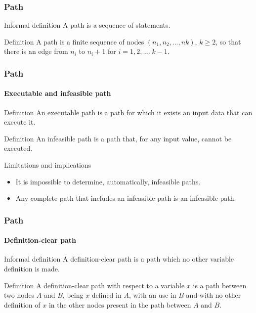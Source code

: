 \begin{frame}[parent={cmap:structural-software-testing},hasnext=true,hasprev=true]
\frametitle{Path}
\label{concept:path}

\begin{block:concept}{Informal definition}
A path is a sequence of statements.
\end{block:concept}

\begin{block:concept}{Definition}
A path is a finite sequence of nodes $(n_1, n_2, . . . , nk)$,
$k \geqslant 2$, so that there is an edge from $n_i$ to $n_i + 1$ for
$i = 1, 2, ... , k - 1$.
\end{block:concept}
\end{frame}


\begin{frame}
\frametitle{Path}
\framesubtitle{Executable and infeasible path}
\label{concept:infeasible-path}
\label{concept:missing-path}

\begin{block:concept}{Definition}
An executable path is a path for which it exists an input data that can
execute it.
\end{block:concept}

\begin{block:concept}{Definition}
An infeasible path is a path that, for any input value, cannot be executed.
\end{block:concept}

\begin{block:fact}{Limitations and implications}
\begin{itemize}
	\item It is impossible to determine, automatically, infeasible paths.

	\item Any complete path that includes an infeasible path is an
	infeasible path.
\end{itemize}
\end{block:fact}

\hfill
{}
\end{frame}



\begin{frame}
\frametitle{Path}
\framesubtitle{Definition-clear path}
\label{concept:definition-clear-path}

\begin{block:concept}{Informal definition}
A definition-clear path is a path which no other variable definition is made.
\end{block:concept}

\begin{block:concept}{Definition}
A definition-clear path with respect to a variable $x$ is a path between two
nodes $A$ and $B$, being $x$ defined in $A$, with an use in $B$ and with no
other definition of $x$ in the other nodes present in the path between $A$ and
$B$.
\end{block:concept}

\hfill
{}
\end{frame}
